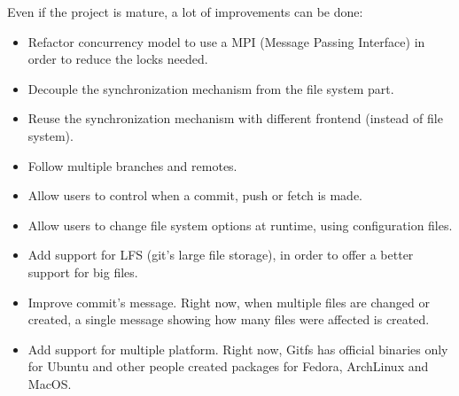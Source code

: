 Even if the project is mature, a lot of improvements can be done:
\begin{itemize}
    \item Refactor concurrency model to use a MPI (Message Passing Interface) in order to reduce the locks needed.
    \item Decouple the synchronization mechanism from the file system part.
    \item Reuse the synchronization mechanism with different frontend (instead of file system).
    \item Follow multiple branches and remotes.
    \item Allow users to control when a commit, push or fetch is made.
    \item Allow users to change file system options at runtime, using configuration files.
    \item Add support for LFS (git's large file storage), in order to offer a better support for big files.
    \item Improve commit's message. Right now, when multiple files are changed or created, a single message showing how many files were affected is created.
    \item Add support for multiple platform. Right now, Gitfs has official binaries only for Ubuntu and other people created packages for Fedora, ArchLinux and MacOS.
\end{itemize}
    